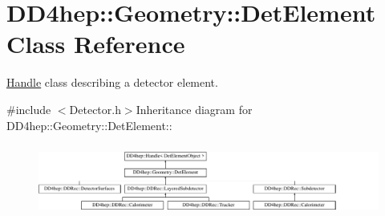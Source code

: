\hypertarget{class_d_d4hep_1_1_geometry_1_1_det_element}{
\section{DD4hep::Geometry::DetElement Class Reference}
\label{class_d_d4hep_1_1_geometry_1_1_det_element}
}


\hyperlink{class_d_d4hep_1_1_handle}{Handle} class describing a detector element.  


{\ttfamily \#include $<$Detector.h$>$}Inheritance diagram for DD4hep::Geometry::DetElement::\begin{figure}[H]
\begin{center}
\leavevmode
\includegraphics[height=2.37288cm]{class_d_d4hep_1_1_geometry_1_1_det_element}
\end{center}
\end{figure}
